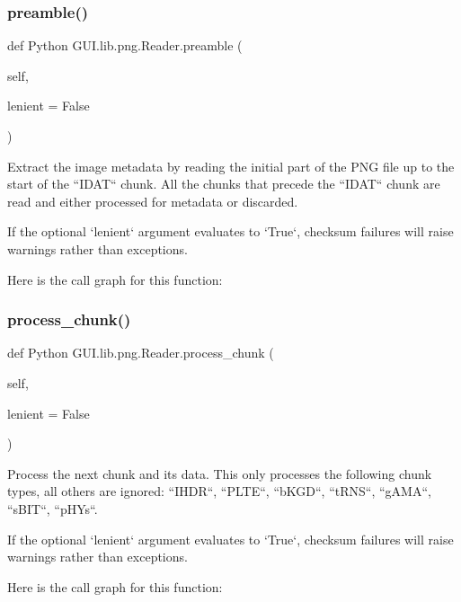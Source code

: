 \subsubsection{\texorpdfstring{preamble()}{preamble()}}
{\footnotesize\ttfamily def Python G\+U\+I.\+lib.\+png.\+Reader.\+preamble (\begin{DoxyParamCaption}\item[{}]{self,  }\item[{}]{lenient = {\ttfamily False} }\end{DoxyParamCaption})}

\begin{DoxyVerb}Extract the image metadata by reading the initial part of
the PNG file up to the start of the ``IDAT`` chunk.  All the
chunks that precede the ``IDAT`` chunk are read and either
processed for metadata or discarded.

If the optional `lenient` argument evaluates to `True`, checksum
failures will raise warnings rather than exceptions.
\end{DoxyVerb}
 Here is the call graph for this function\+:
\mbox{\label{class_python_01_g_u_i_1_1lib_1_1png_1_1_reader_aea5628481337f39025300c679a21502f}} 
\subsubsection{\texorpdfstring{process\+\_\+chunk()}{process\_chunk()}}
{\footnotesize\ttfamily def Python G\+U\+I.\+lib.\+png.\+Reader.\+process\+\_\+chunk (\begin{DoxyParamCaption}\item[{}]{self,  }\item[{}]{lenient = {\ttfamily False} }\end{DoxyParamCaption})}

\begin{DoxyVerb}Process the next chunk and its data.  This only processes the
following chunk types, all others are ignored: ``IHDR``,
``PLTE``, ``bKGD``, ``tRNS``, ``gAMA``, ``sBIT``, ``pHYs``.

If the optional `lenient` argument evaluates to `True`,
checksum failures will raise warnings rather than exceptions.
\end{DoxyVerb}
 Here is the call graph for this function\+:
\mbox{\label{class_python_01_g_u_i_1_1lib_1_1png_1_1_reader_ac8def3e2a70eb8e229973086d39bd60a}} 

